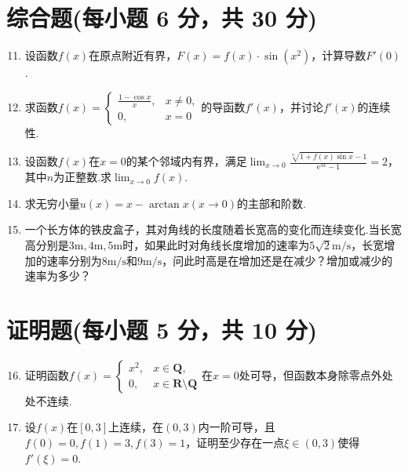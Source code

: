 \documentclass[../Main.tex]{subfiles}
\begin{document}
\section{综合题(每小题 6 分，共 30 分)}
\begin{enumerate}
    \setcounter{enumi}{10}
    \item 设函数$f(x)$在原点附近有界，$F(x)=f(x)\cdot\sin\left(x^{2}\right)$，计算导数$F
              '(0)$.
          \vspace{8em}

    \item 求函数$f(x)=
              \begin{cases}
                  \frac{1-\cos x}{x}, & x\neq0, \\
                  0,                  & x=0
              \end{cases}$的导函数$f'(x)$，并讨论$f'(x)$的连续性.
          \vspace{8em}

    \item 设函数$f(x)$在$x=0$的某个邻域内有界，满足$\lim_{x\to0}\frac{\sqrt[n]{1+f(x)\sin
                      x}-1}{\mathrm{e}^{3x}-1}=2$，其中$n$为正整数.求$\lim_{x\to0}f(x)$.
          \vspace{9em}

    \item 求无穷小量$u(x)=x-\arctan x(x\to0)$的主部和阶数.
          \vspace{10em}

    \item 一个长方体的铁皮盒子，其对角线的长度随着长宽高的变化而连续变化.当长宽高分别是$3
              \mathrm{m},4\mathrm{m},5\mathrm{m}$时，如果此时对角线长度增加的速率为$5\sqrt{2}
              \mathrm{m/s}$，长宽增加的速率分别为$8\mathrm{m/s}$和$9\mathrm{m/s}$，问此时高是在增加还是在减少？增加或减少的速率为多少？
          \vspace{12em}
\end{enumerate}

\section{证明题(每小题 5 分，共 10 分)}
\begin{enumerate}
    \setcounter{enumi}{15}
    \item 证明函数$f(x)=
              \begin{cases}
                  x^{2}, & x\in\mathbf{Q},                   \\
                  0,     & x\in\mathbf{R}\setminus\mathbf{Q}
              \end{cases}$在$x=0$处可导，但函数本身除零点外处处不连续.
          \vspace{12em}

    \item 设$f(x)$在$[0,3]$上连续，在$(0,3)$内一阶可导，且$f(0)=0,f(1)=3,f(3
              )=1$，证明至少存在一点$\xi\in(0,3)$使得$f'(\xi)=0$.
\end{enumerate}
\end{document}

